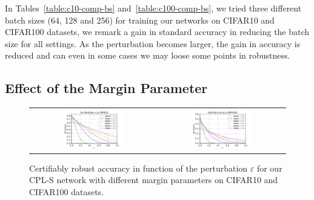 In Tables~\ref{table:c10-comp-bs} and~\ref{table:c100-comp-bs}, we tried three different batch sizes (64, 128 and 256) for training our networks on CIFAR10 and CIFAR100 datasets, we remark a gain in standard accuracy in reducing the batch size for all settings. As the perturbation becomes larger, the gain in accuracy is reduced and can even in some cases we may loose some points in robustness.

\newpage
\subsection{Effect of the Margin Parameter}

\begin{figure}[h]
    \centering
    \begin{tabular}{cc}
    \includegraphics[width=0.49\textwidth]{sections/4_certification/images/cert_acc_margin_eps_c10.pdf}&\includegraphics[width=0.49\textwidth]{sections/4_certification/images/cert_acc_margin_eps_c100.pdf}
    \end{tabular}
    \caption{Certifiably robust accuracy in function of the perturbation $\varepsilon$ for our CPL-S  network with different margin parameters on CIFAR10 and CIFAR100 datasets.}
    \label{fig:cert-acc-margin}
\end{figure}


